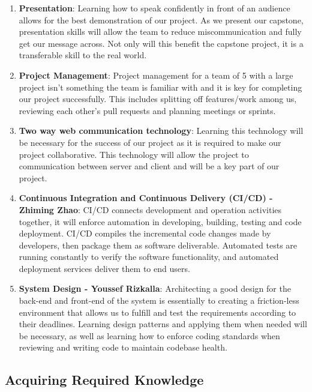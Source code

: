 \documentclass[12pt, titlepage]{article}
\begin{document}
\begin{enumerate}

\item  \textbf{Presentation}:
Learning how to speak confidently in front of an audience allows for the best demonstration of our project. As we present our capstone, presentation skills will allow the team to reduce miscommunication and fully get our message across. Not only will this benefit the capstone project, it is a transferable skill to the real world. 

\item  \textbf{Project Management}:
Project management for a team of 5 with a large project isn't something the team is familiar with and it is key for completing our project successfully. This includes splitting off features/work among us, reviewing each other's pull requests and planning meetings or sprints.

\item \textbf{Two way web communication technology}: Learning this technology will be necessary for the success of our project as it is required to make our project collaborative. This technology will allow the project to communication between server and client and will be a key part of our project.

\item  \textbf{Continuous Integration and Continuous Delivery (CI/CD) - Zhiming Zhao}:
CI/CD connects development and operation activities together, it will enforce automation in developing, building, testing and code deployment. CI/CD compiles the incremental code changes made by developers, then package them as software deliverable. Automated tests are running constantly to verify the software functionality, and automated deployment services deliver them to end users. 

\item \textbf{System Design - Youssef Rizkalla}: 
Architecting a good design for the back-end and front-end of the system is essentially to creating a friction-less environment that allows us to fulfill and test the requirements according to their deadlines. Learning design patterns and applying them when needed will be necessary, as well as learning how to enforce coding standards when reviewing and writing code to maintain codebase health.

\end{enumerate}

\subsection{Acquiring Required Knowledge}
\end{document}
